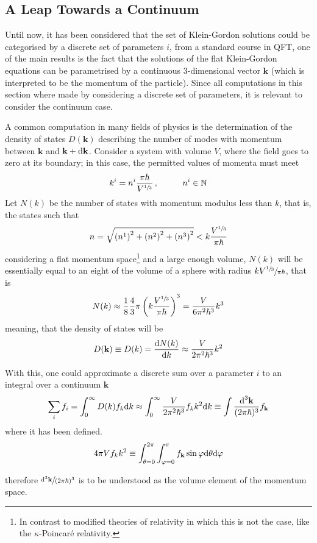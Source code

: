 \subsection{A Leap Towards a Continuum}
Until now, it has been considered that the set of Klein-Gordon solutions could be categorised by a discrete set of parameters $i$, from a standard course in QFT, one of the main results is the fact that the solutions of the flat Klein-Gordon equations can be parametrised by a continuous $3$-dimensional vector $\mathbf{k}$ (which is interpreted to be the momentum of the particle). Since all computations in this section where made by considering a discrete set of parameters, it is relevant to consider the continuum case.

A common computation in many fields of physics is the determination of the density of states $D(\mathbf{k})$ describing the number of modes with momentum between $\mathbf{k}$ and $\mathbf{k}+\text{d} \mathbf{k}$. Consider a system with volume $V$, where the field goes to zero at its boundary; in this case, the permitted values of momenta must meet
\begin{equation}
	k^i=n^i\frac{\pi\hbar}{V^{\sfrac{1}{3}}}\,,\hspace{1.0cm}n^i\in\mathbb{N}
\end{equation}
Let $N(k)$ be the number of states with momentum modulus less than $k$, that is, the states such that
\begin{equation}
	n=\sqrt{\left(n^1\right)^2+\left(n^2\right)^2+\left(n^3\right)^2}<k\frac{V^{\sfrac{1}{3}}}{\pi\hbar}
\end{equation}
considering a flat momentum space\footnote{In contrast to modified theories of relativity in which this is not the case, like the $\kappa$-Poincaré relativity.} and a large enough volume, $N(k)$ will be essentially equal to an eight of the volume of a sphere with radius $kV^{\sfrac{1}{3}}\sfrac{}{\pi\hbar}$, that is
\begin{equation}
	N(k)\approx\frac{1}{8}\frac{4}{3}\pi\left(k\frac{V^{\sfrac{1}{3}}}{\pi\hbar}\right)^3=\frac{V}{6\pi^2\hbar^3}k^3
\end{equation} 
meaning, that the density of states will be
\begin{equation}
	D(\mathbf{k})\equiv D(k)=\frac{\text{d} N(k)}{\text{d} k}\approx\frac{V}{2\pi^2\hbar^3}k^2
\end{equation}

With this, one could approximate a discrete sum over a parameter $i$ to an integral over a continuum $\mathbf{k}$
\begin{equation}
	\sum_i f_i=\int_0^\infty D(k)f_k\text{d} k\approx\int_0^\infty\frac{V}{2\pi^2\hbar^3} f_k k^2\text{d} k\equiv\int\frac{\text{d}^3\mathbf{k}}{(2\pi\hbar)^3}f_\mathbf{k}
\end{equation}
where it has been defined.
\begin{equation}
	4\pi V f_k k^2\equiv \int_{\theta=0}^{2\pi}\int_{\varphi=0}^\pi f_\mathbf{k}\sin\varphi \text{d}\theta\text{d}\varphi
\end{equation}

therefore $\sfrac{\text{d}^3\mathbf{k}}{(2\pi\hbar)^3}$ is to be understood as the volume element of the momentum space.